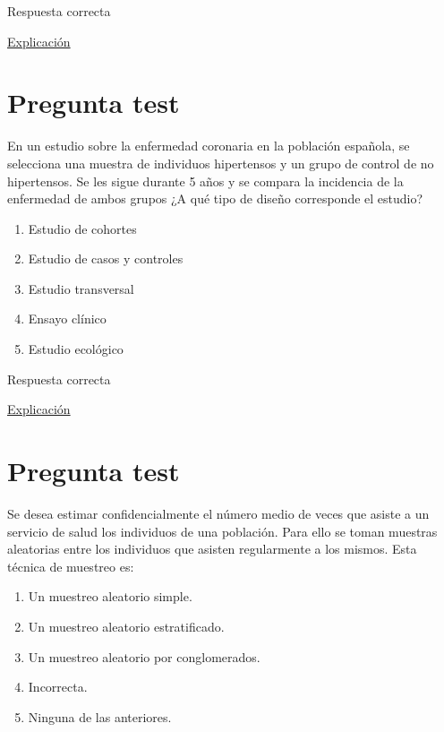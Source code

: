 \documentclass[
]{book}
\providecommand{\tightlist}{%
  \setlength{\itemsep}{0pt}\setlength{\parskip}{0pt}}
\begin{document}
Respuesta correcta

\href{https://www.encyclo.co.uk/meaning-of-Naturalistic_paradigm}{Explicación}

\hypertarget{pregunta-test-13}{%
\section{Pregunta test}\label{pregunta-test-13}}

En un estudio sobre la enfermedad coronaria en la población española, se selecciona una muestra de individuos hipertensos y un grupo de control de no hipertensos. Se les sigue durante 5 años y se compara la incidencia de la enfermedad de ambos grupos ¿A qué tipo de diseño corresponde el estudio?

\begin{enumerate}
\def\labelenumi{\alph{enumi})}
\tightlist
\item
  Estudio de cohortes
\item
  Estudio de casos y controles
\item
  Estudio transversal
\item
  Ensayo clínico
\item
  Estudio ecológico
\end{enumerate}

Respuesta correcta

\href{https://es.wikipedia.org/wiki/Estudio_de_cohorte}{Explicación}

\hypertarget{pregunta-test-14}{%
\section{Pregunta test}\label{pregunta-test-14}}

Se desea estimar confidencialmente el número medio de veces que asiste a un servicio de salud los individuos de una población. Para ello se toman muestras aleatorias entre los individuos que asisten regularmente a los mismos. Esta técnica de muestreo es:

\begin{enumerate}
\def\labelenumi{\alph{enumi})}
\tightlist
\item
  Un muestreo aleatorio simple.
\item
  Un muestreo aleatorio estratificado.
\item
  Un muestreo aleatorio por conglomerados.
\item
  Incorrecta.
\item
  Ninguna de las anteriores.
\end{enumerate}
\end{document}
